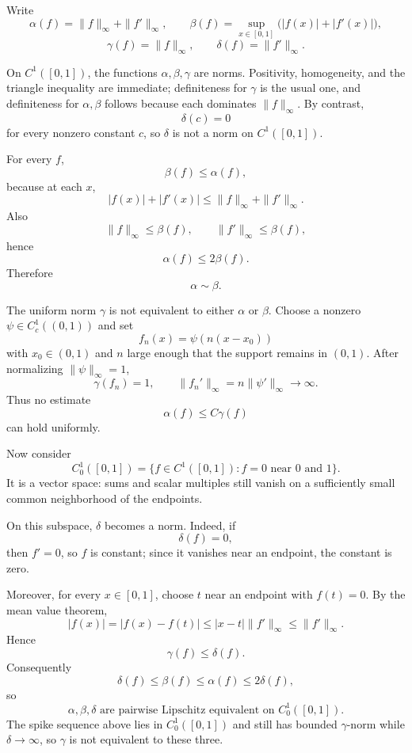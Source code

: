 \begin{solution}
Write
\[
\alpha(f)=\|f\|_\infty+\|f'\|_\infty,\qquad
\beta(f)=\sup_{x\in[0,1]}\bigl(|f(x)|+|f'(x)|\bigr),
\]
\[
\gamma(f)=\|f\|_\infty,\qquad
\delta(f)=\|f'\|_\infty.
\]

On \(C^1([0,1])\), the functions \(\alpha,\beta,\gamma\) are norms. Positivity,
homogeneity, and the triangle inequality are immediate; definiteness for \(\gamma\)
is the usual one, and definiteness for \(\alpha,\beta\) follows because each dominates
\(\|f\|_\infty\). By contrast,
\[
\delta(c)=0
\]
for every nonzero constant \(c\), so \(\delta\) is not a norm on \(C^1([0,1])\).

For every \(f\),
\[
\beta(f)\le \alpha(f),
\]
because at each \(x\),
\[
|f(x)|+|f'(x)|
\le
\|f\|_\infty+\|f'\|_\infty.
\]
Also
\[
\|f\|_\infty\le\beta(f),
\qquad
\|f'\|_\infty\le\beta(f),
\]
hence
\[
\alpha(f)\le2\beta(f).
\]
Therefore
\[
\boxed{\alpha\sim\beta.}
\]

The uniform norm \(\gamma\) is not equivalent to either \(\alpha\) or \(\beta\). Choose a
nonzero \(\psi\in C_c^1((0,1))\) and set
\[
f_n(x)=\psi(n(x-x_0))
\]
with \(x_0\in(0,1)\) and \(n\) large enough that the support remains in \((0,1)\).
After normalizing \(\|\psi\|_\infty=1\),
\[
\gamma(f_n)=1,
\qquad
\|f_n'\|_\infty
=
n\|\psi'\|_\infty\to\infty.
\]
Thus no estimate
\[
\alpha(f)\le C\gamma(f)
\]
can hold uniformly.

Now consider
\[
C_0^1([0,1])
=
\{f\in C^1([0,1]):f=0\text{ near }0\text{ and }1\}.
\]
It is a vector space: sums and scalar multiples still vanish on a sufficiently small
common neighborhood of the endpoints.

On this subspace, \(\delta\) becomes a norm. Indeed, if
\[
\delta(f)=0,
\]
then \(f'=0\), so \(f\) is constant; since it vanishes near an endpoint, the constant is
zero.

Moreover, for every \(x\in[0,1]\), choose \(t\) near an endpoint with \(f(t)=0\). By the
mean value theorem,
\[
|f(x)|
=
|f(x)-f(t)|
\le
|x-t|\|f'\|_\infty
\le
\|f'\|_\infty.
\]
Hence
\[
\gamma(f)\le\delta(f).
\]
Consequently
\[
\delta(f)\le\beta(f)\le\alpha(f)\le2\delta(f),
\]
so
\[
\boxed{\alpha,\beta,\delta\text{ are pairwise Lipschitz equivalent on }C_0^1([0,1]).}
\]
The spike sequence above lies in \(C_0^1([0,1])\) and still has bounded \(\gamma\)-norm
while \(\delta\to\infty\), so \(\gamma\) is not equivalent to these three.


\end{solution}
